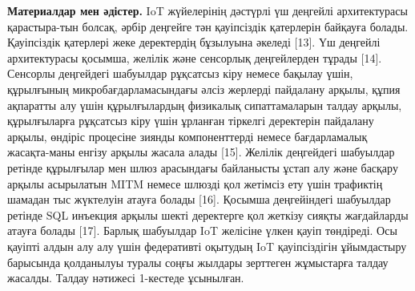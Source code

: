 \begin{multicols}{2}
{\bfseries Материалдар мен әдістер.} IoT жүйелерінің дәстүрлі үш деңгейлі
архитектурасы қарастыра-тын болсақ, әрбір деңгейге тән қауіпсіздік
қатерлерін байқауға болады. Қауіпсіздік қатерлері жеке деректердің
бұзылуына әкеледі {[}13{]}. Үш деңгейлі архитектурасы қосымша, желілік
және сенсорлық деңгейлерден тұрады {[}14{]}. Сенсорлы деңгейдегі
шабуылдар рұқсатсыз кіру немесе бақылау үшін, құрылғының
микробағдарламасындағы әлсіз жерлерді пайдалану арқылы, құпия ақпаратты
алу үшін құрылғылардың физикалық сипаттамаларын талдау арқылы,
құрылғыларға рұқсатсыз кіру үшін ұрланған тіркелгі деректерін пайдалану
арқылы, өндіріс процесіне зиянды компоненттерді немесе бағдарламалық
жасақта-маны енгізу арқылы жасала алады {[}15{]}. Желілік деңгейдегі
шабуылдар ретінде құрылғылар мен шлюз арасындағы байланысты ұстап алу
және басқару арқылы асырылатын MITM немесе шлюзді қол жетімсіз ету үшін
трафиктің шамадан тыс жүктелуін атауға болады {[}16{]}. Қосымша
деңгейіндегі шабуылдар ретінде SQL инъекция арқылы шекті деректерге қол
жеткізу сияқты жағдайларды атауға болады {[}17{]}. Барлық шабуылдар IoT
желісіне үлкен қауіп төндіреді. Осы қауіпті алдын алу алу үшін
федеративті оқытудың IoT қауіпсіздігін ұйымдастыру барысында қолданылуы
туралы соңғы жылдары зерттеген жұмыстарға талдау жасалды. Талдау
нәтижесі 1-кестеде ұсынылған.
\end{multicols}

\newpage



